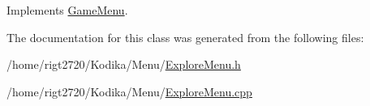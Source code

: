 Implements \hyperlink{classGameMenu_ac32ff465c5a4f30979e8851fa21cb230}{Game\-Menu}.



The documentation for this class was generated from the following files\-:\begin{DoxyCompactItemize}
\item 
/home/rigt2720/\-Kodika/\-Menu/\hyperlink{ExploreMenu_8h}{Explore\-Menu.\-h}\item 
/home/rigt2720/\-Kodika/\-Menu/\hyperlink{ExploreMenu_8cpp}{Explore\-Menu.\-cpp}\end{DoxyCompactItemize}
